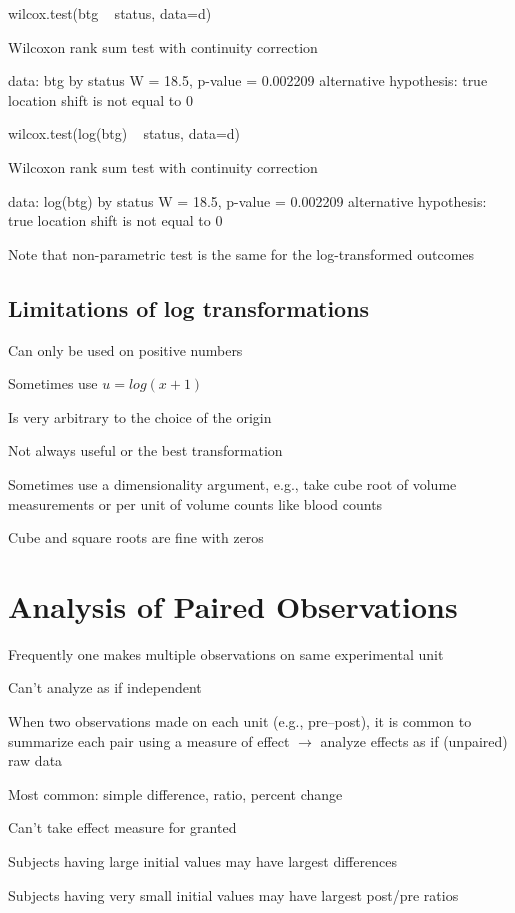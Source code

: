 \begin{Schunk}
\begin{Sinput}
wilcox.test(btg ~ status, data=d)
\end{Sinput}
\begin{Soutput}

	Wilcoxon rank sum test with continuity correction

data:  btg by status
W = 18.5, p-value = 0.002209
alternative hypothesis: true location shift is not equal to 0
\end{Soutput}
\begin{Sinput}
wilcox.test(log(btg) ~ status, data=d)
\end{Sinput}
\begin{Soutput}

	Wilcoxon rank sum test with continuity correction

data:  log(btg) by status
W = 18.5, p-value = 0.002209
alternative hypothesis: true location shift is not equal to 0
\end{Soutput}
\end{Schunk}
  \item Note that non-parametric test is the same for the log-transformed outcomes
\ei


\subsection{Limitations of log transformations}
\bi
  \item Can only be used on positive numbers
   \bi
    \item Sometimes use $u = log(x+1)$
   \ei
  \item Is very arbitrary to the choice of the origin
  \item Not always useful or the best transformation
  \item Sometimes use a dimensionality argument, e.g., take cube root
    of volume measurements or per unit of volume counts like blood counts
  \item Cube and square roots are fine with zeros
\ei

\section{Analysis of Paired Observations}
\bi
\item   Frequently one makes multiple observations on same
experimental unit
\item   Can't analyze as if independent
\item   When two observations made on each unit (e.g., pre--post),
        it is common to summarize each pair using a measure of effect
        $\rightarrow$ analyze effects as if (unpaired) raw data
\item   Most common: simple difference, ratio, percent change
\item   Can't take effect measure for granted
\item   Subjects having large initial values may have largest
        differences
\item   Subjects having very small initial values may have
        largest post/pre ratios
\ei

